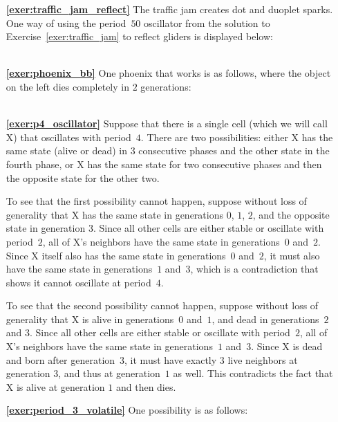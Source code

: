 \begin{multicols}{2}
\begin{itemize}[leftmargin=0em]
		
		\item[\bf\color{ocre}\sffamily\ref{exer:traffic_jam_reflect}] The traffic jam creates dot and duoplet sparks. One way of using the period~$50$ oscillator from the solution to Exercise~\ref{exer:traffic_jam} to reflect gliders is displayed below: \\[-0.6em]
		
		 \\
		
		
		\item[\bf\color{ocre}\sffamily\ref{exer:phoenix_bb}] One phoenix that works is as follows, where the object on the left dies completely in $2$ generations: \\[-0.6em]
		
		 \\
		
		
		\item[\bf\color{ocre}\sffamily\ref{exer:p4_oscillator}] Suppose that there is a single cell (which we will call X) that oscillates with period~$4$. There are two possibilities: either X has the same state (alive or dead) in $3$ consecutive phases and the other state in the fourth phase, or X has the same state for two consecutive phases and then the opposite state for the other two.
		
		To see that the first possibility cannot happen, suppose without loss of generality that X has the same state in generations $0$, $1$, $2$, and the opposite state in generation $3$. Since all other cells are either stable or oscillate with period~$2$, all of X's neighbors have the same state in generations~$0$ and~$2$. Since X itself also has the same state in generations~$0$ and~$2$, it must also have the same state in generations~$1$ and~$3$, which is a contradiction that shows it cannot oscillate at period~$4$.
		
		To see that the second possibility cannot happen, suppose without loss of generality that X is alive in generations~$0$ and~$1$, and dead in generations~$2$ and $3$. Since all other cells are either stable or oscillate with period~$2$, all of X's neighbors have the same state in generations~$1$ and~$3$. Since X is dead and born after generation~$3$, it must have exactly $3$ live neighbors at generation $3$, and thus at generation~$1$ as well. This contradicts the fact that X is alive at generation $1$ and then dies.\\
		
		
		\item[\bf\color{ocre}\sffamily\ref{exer:period_3_volatile}] One possibility is as follows: \\[-0.6em]
		
		 \\
	\end{itemize}
\end{multicols}


